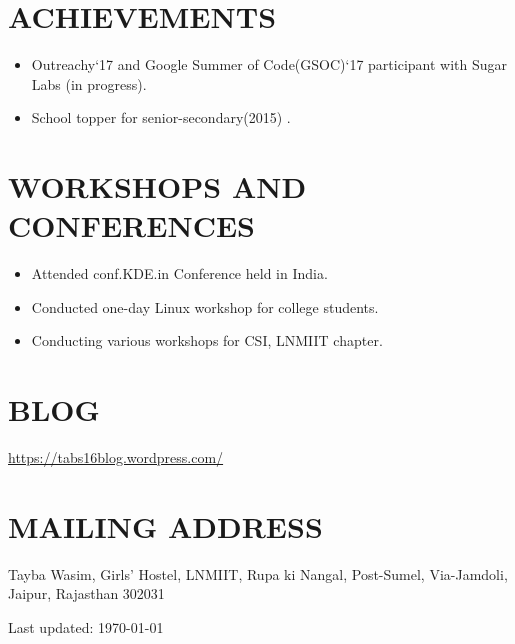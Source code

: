 \documentclass[margin]{res}
\begin{document}
\begin{resume}
\section{ACHIEVEMENTS}
	\begin{itemize}
		\item Outreachy`17 and Google Summer of Code(GSOC)`17 participant with Sugar Labs (in progress). 
		\item School topper for senior-secondary(2015) .
	\end{itemize}

\section{WORKSHOPS AND CONFERENCES}
	
	\begin{itemize}
		\item Attended conf.KDE.in Conference held in India.
		\item Conducted one-day Linux workshop for college students.
		\item Conducting various workshops for CSI, LNMIIT chapter.
\end{itemize} 

\section{BLOG}
\url{https://tabs16blog.wordpress.com/}

\section{MAILING ADDRESS}
Tayba Wasim, Girls' Hostel, LNMIIT, Rupa ki Nangal, Post-Sumel, Via-Jamdoli, Jaipur, Rajasthan 302031


 
\begin{center}
  \begin{footnotesize}
    Last updated: \today \\
  \end{footnotesize}
\end{center}

\end{resume}
\end{document}
